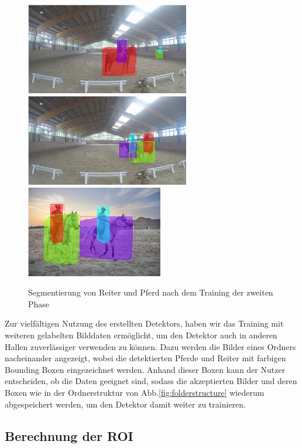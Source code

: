 \begin{figure}
\centering
\includegraphics[height=4cm,trim={12cm 0 3cm 0},clip]{./img/IndoorMaske.png}
\includegraphics[height=4cm,trim={15cm 0 0 0},clip]{./img/IndoorMaske2.png}
\includegraphics[height=4cm,trim={1cm 0 3cm 0},clip]{./img/OutdoorMaske.png}
\caption{Segmentierung von Reiter und Pferd nach dem Training der zweiten Phase}
\label{fig:SegmentierungPhase2}
\end{figure}

Zur vielfältigen Nutzung des erstellten Detektors, haben wir das Training mit weiteren gelabelten Bilddaten ermöglicht, um den Detektor auch in anderen Hallen zuverlässiger verwenden zu können. Dazu werden die Bilder eines Ordners nacheinander angezeigt, wobei die detektierten Pferde und Reiter mit farbigen Bounding Boxen eingezeichnet werden. Anhand dieser Boxen kann der Nutzer entscheiden, ob die Daten geeignet sind, sodass die akzeptierten Bilder und deren Boxen wie in der Ordnerstruktur von Abb.\ref{fig:folderstructure} wiederum abgespeichert werden, um den Detektor damit weiter zu trainieren.

\subsection*{Berechnung der ROI}

